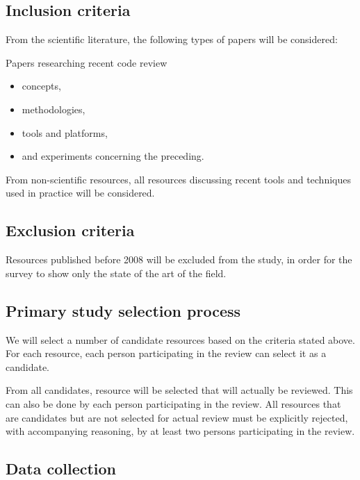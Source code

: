 \documentclass[]{book}
\providecommand{\tightlist}{%
  \setlength{\itemsep}{0pt}\setlength{\parskip}{0pt}}
\begin{document}
\subsection{Inclusion criteria}\label{inclusion-criteria}

From the scientific literature, the following types of papers will be
considered:

Papers researching recent code review

\begin{itemize}
\tightlist
\item
  concepts,
\item
  methodologies,
\item
  tools and platforms,
\item
  and experiments concerning the preceding.
\end{itemize}

From non-scientific resources, all resources discussing recent tools and
techniques used in practice will be considered.

\subsection{Exclusion criteria}\label{exclusion-criteria}

Resources published before 2008 will be excluded from the study, in
order for the survey to show only the state of the art of the field.

\subsection{Primary study selection
process}\label{primary-study-selection-process}

We will select a number of candidate resources based on the criteria
stated above. For each resource, each person participating in the review
can select it as a candidate.

From all candidates, resource will be selected that will actually be
reviewed. This can also be done by each person participating in the
review. All resources that are candidates but are not selected for
actual review must be explicitly rejected, with accompanying reasoning,
by at least two persons participating in the review.

\subsection{Data collection}\label{data-collection}
\end{document}
